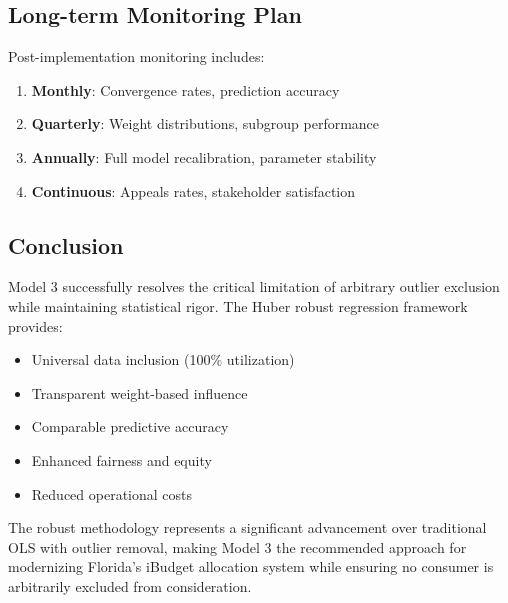 \subsection{Long-term Monitoring Plan}

Post-implementation monitoring includes:
\begin{enumerate}
    \item \textbf{Monthly}: Convergence rates, prediction accuracy
    \item \textbf{Quarterly}: Weight distributions, subgroup performance
    \item \textbf{Annually}: Full model recalibration, parameter stability
    \item \textbf{Continuous}: Appeals rates, stakeholder satisfaction
\end{enumerate}

\subsection{Conclusion}

Model 3 successfully resolves the critical limitation of arbitrary outlier exclusion while maintaining statistical rigor. The Huber robust regression framework provides:
\begin{itemize}
    \item Universal data inclusion (100\% utilization)
    \item Transparent weight-based influence
    \item Comparable predictive accuracy
    \item Enhanced fairness and equity
    \item Reduced operational costs
\end{itemize}

The robust methodology represents a significant advancement over traditional OLS with outlier removal, making Model 3 the recommended approach for modernizing Florida's iBudget allocation system while ensuring no consumer is arbitrarily excluded from consideration.